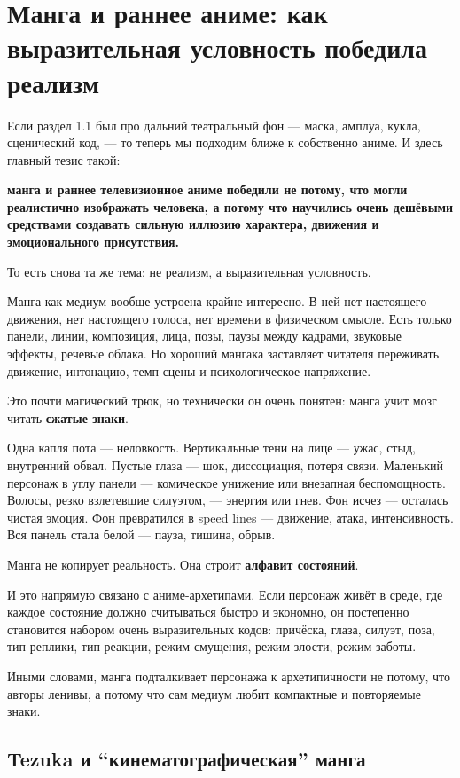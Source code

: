 \section{Манга и раннее аниме: как выразительная условность победила реализм}

Если раздел 1.1 был про дальний театральный фон --- маска, амплуа,
кукла, сценический код, --- то теперь мы подходим ближе к собственно
аниме. И здесь главный тезис такой:

\textbf{манга и раннее телевизионное аниме победили не потому, что могли
реалистично изображать человека, а потому что научились очень дешёвыми
средствами создавать сильную иллюзию характера, движения и
эмоционального присутствия.}

То есть снова та же тема: не реализм, а выразительная условность.

Манга как медиум вообще устроена крайне интересно. В ней нет настоящего
движения, нет настоящего голоса, нет времени в физическом смысле. Есть
только панели, линии, композиция, лица, позы, паузы между кадрами,
звуковые эффекты, речевые облака. Но хороший мангака заставляет читателя
переживать движение, интонацию, темп сцены и психологическое напряжение.

Это почти магический трюк, но технически он очень понятен: манга учит
мозг читать \textbf{сжатые знаки}.

Одна капля пота --- неловкость. Вертикальные тени на лице --- ужас,
стыд, внутренний обвал. Пустые глаза --- шок, диссоциация, потеря связи.
Маленький персонаж в углу панели --- комическое унижение или внезапная
беспомощность. Волосы, резко взлетевшие силуэтом, --- энергия или гнев.
Фон исчез --- осталась чистая эмоция. Фон превратился в speed lines ---
движение, атака, интенсивность. Вся панель стала белой --- пауза,
тишина, обрыв.

Манга не копирует реальность. Она строит \textbf{алфавит состояний}.

И это напрямую связано с аниме-архетипами. Если персонаж живёт в среде,
где каждое состояние должно считываться быстро и экономно, он постепенно
становится набором очень выразительных кодов: причёска, глаза, силуэт,
поза, тип реплики, тип реакции, режим смущения, режим злости, режим
заботы.

Иными словами, манга подталкивает персонажа к архетипичности не потому,
что авторы ленивы, а потому что сам медиум любит компактные и
повторяемые знаки.

\subsection*{Tezuka и ``кинематографическая'' манга}

